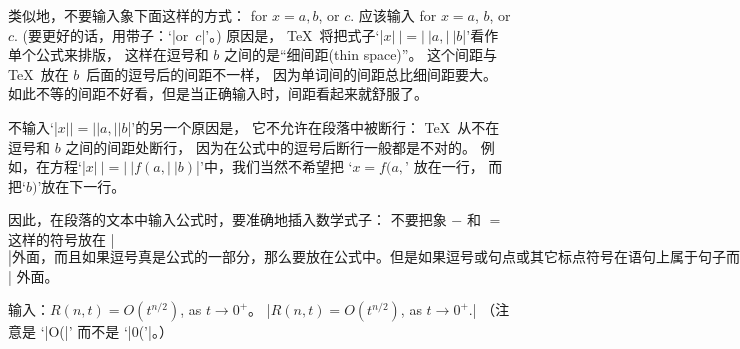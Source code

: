 类似地，不要输入象下面这样的方式：
\begintt
for $x = a, b$, or $c$.
\endtt
应该输入
\begintt
for $x = a$, $b$, or $c$.
\endtt
(要更好的话，用带子：`|or~$c$|'。)
原因是， \TeX\ 将把式子`|$x|~|=|~|a,|~|b$|'看作单个公式来排版，
这样在逗号和 $b$ 之间的是``细间距(thin space)''。%
这个间距与 \TeX\ 放在 $b$~{后面}的逗号后的间距不一样，
因为单词间的间距总比细间距要大。%
如此不等的间距不好看，但是当正确输入时，间距看起来就舒服了。

不输入`|$x| |=| |a,| |b$|'的另一个原因是，
它不允许在段落中被断行：
 \TeX\ 从不在逗号和 $b$ 之间的间距处断行，
因为在公式中的逗号后断行一般都是不对的。%
例如，在方程`|$x|~|=|~|f(a,|~|b)$|'中，我们当然不希望把 `$x=f(a,$' 放在一行，
而把`$b)$'放在下一行。

因此，在段落的文本中输入公式时，要准确地插入数学式子：
不要把象 $-$ 和 $=$ 这样的符号放在 |$| 外面，
而且如果逗号真是公式的一部分，那么要放在公式中。%
但是如果逗号或句点或其它标点符号在语句上属于句子而不是公式，
要把它放在 |$| 外面。

\exercise 输入：$R(n,t)=O(t^{n/2})$, as $t\to0^+$。
\answer |$R(n,t)=O(t^{n/2})$, as $t\to0^+$.|%
（注意是 `|O(|' 而不是 `|0('|。）

